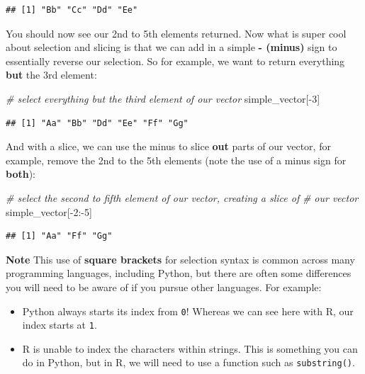 \documentclass[
]{book}
\newenvironment{Shaded}{\begin{snugshade}}{\end{snugshade}}
\newcommand{\CommentTok}[1]{\textcolor[rgb]{0.56,0.35,0.01}{\textit{#1}}}
\newcommand{\DecValTok}[1]{\textcolor[rgb]{0.00,0.00,0.81}{#1}}
\newcommand{\NormalTok}[1]{#1}
\newcommand{\SpecialCharTok}[1]{\textcolor[rgb]{0.00,0.00,0.00}{#1}}
\providecommand{\tightlist}{%
  \setlength{\itemsep}{0pt}\setlength{\parskip}{0pt}}
\begin{document}
\begin{verbatim}
## [1] "Bb" "Cc" "Dd" "Ee"
\end{verbatim}

You should now see our 2nd to 5th elements returned. Now what is super cool about selection and slicing is that we can add in a simple \textbf{- (minus)} sign to essentially reverse our selection. So for example, we want to return everything \textbf{but} the 3rd element:

\begin{Shaded}
\begin{Highlighting}[]
\CommentTok{\# select everything but the third element of our vector}
\NormalTok{simple\_vector[}\SpecialCharTok{{-}}\DecValTok{3}\NormalTok{]}
\end{Highlighting}
\end{Shaded}

\begin{verbatim}
## [1] "Aa" "Bb" "Dd" "Ee" "Ff" "Gg"
\end{verbatim}

And with a slice, we can use the minus to slice \textbf{out} parts of our vector, for example, remove the 2nd to the 5th elements (note the use of a minus sign for \textbf{both}):

\begin{Shaded}
\begin{Highlighting}[]
\CommentTok{\# select the second to fifth element of our vector, creating a \textquotesingle{}slice\textquotesingle{} of}
\CommentTok{\# our vector}
\NormalTok{simple\_vector[}\SpecialCharTok{{-}}\DecValTok{2}\SpecialCharTok{:{-}}\DecValTok{5}\NormalTok{]}
\end{Highlighting}
\end{Shaded}

\begin{verbatim}
## [1] "Aa" "Ff" "Gg"
\end{verbatim}

\textbf{Note}
This use of \textbf{square brackets} for selection syntax is common across many programming languages, including Python, but there are often some differences you will need to be aware of if you pursue other languages. For example:

\begin{itemize}
\tightlist
\item
  Python always starts its index from \texttt{0}! Whereas we can see here with R, our index starts at \texttt{1}.
\item
  R is unable to index the characters within strings. This is something you can do in Python, but in R, we will need to use a function such as \texttt{substring()}.
\end{itemize}
\end{document}
